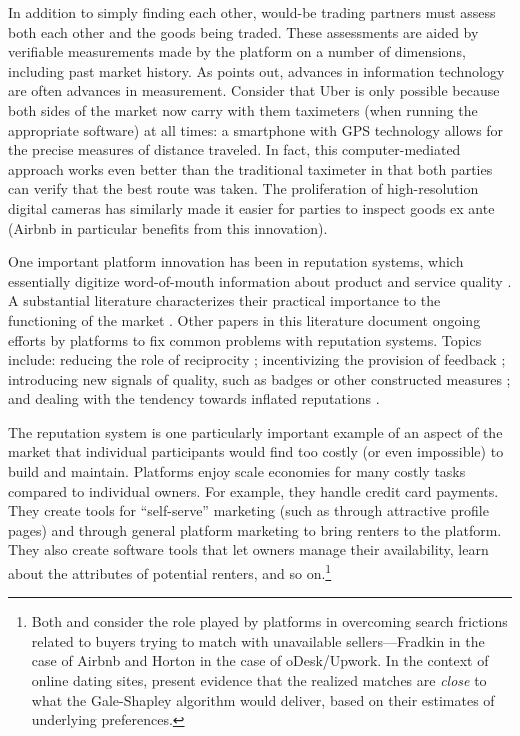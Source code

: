 \documentclass[11pt]{article}
\begin{document}
In addition to simply finding each other, would-be trading partners must assess both each other and the goods being traded. 
These assessments are aided by verifiable measurements made by the platform on a number of dimensions, including past market history. 
As \cite{varian2010computer} points out, advances in information technology are often advances in measurement.  
Consider that Uber is only possible because both sides of the market now carry with them taximeters (when running the appropriate software) at all times: 
a smartphone with GPS technology allows for the precise measures of distance traveled.
In fact, this computer-mediated approach works even better than the traditional taximeter in that both parties can verify that the best route was taken. 
The proliferation of high-resolution digital cameras has similarly made it easier for parties to inspect goods ex ante (Airbnb in particular benefits from this innovation).  

One important platform innovation has been in reputation systems, which essentially digitize word-of-mouth information about product and service quality \citep{dellarocas2003digitization}. 
A substantial literature characterizes their practical importance to the functioning of the market \citep{cabral2010dynamics, resnick2000reputation, resnick2002trust}.
Other papers in this literature document ongoing efforts by platforms to fix common problems with reputation systems.
Topics include: reducing the role of reciprocity \citep{bolton2013engineering};
incentivizing the provision of feedback \citep{fradkin2015bias}; 
introducing new signals of quality, such as badges or other constructed measures \citep{hui2014lemon, nosko2015limits}; 
and dealing with the tendency towards inflated reputations \citep{horton2015reputation}.  

The reputation system is one particularly important example of an aspect of the market that individual participants would find too costly (or even impossible) to build and maintain. 
Platforms enjoy scale economies for many costly tasks compared to individual owners. 
For example, they handle credit card payments. 
They create tools for ``self-serve'' marketing (such as through attractive profile pages) and through general platform marketing to bring renters to the platform. 
They also create software tools that let owners manage their availability, learn about the attributes of potential renters, and so on.\footnote{
  Both \cite{horton2014misdirected} and \cite{fradkin2013search} consider the role played by platforms in overcoming search frictions related to buyers trying to match with unavailable sellers---Fradkin in the case of Airbnb and Horton in the case of oDesk/Upwork.
  In the context of online dating sites, \cite{hitsch2010matching} present evidence that the realized matches are \emph{close} to what the Gale-Shapley algorithm would deliver, based on their estimates of underlying preferences.
}
\end{document}
